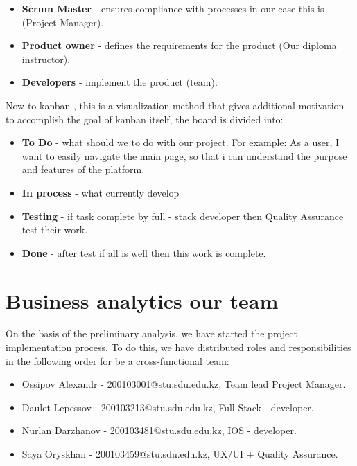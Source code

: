 \begin{itemize}
    \item \textbf{Scrum Master} - ensures compliance with processes in our case this is  (Project Manager).
    \item \textbf{Product owner} - defines the requirements for the product (Our diploma instructor).
    \item \textbf{Developers} - implement the product (team). 
\end{itemize}

Now to kanban \cite{kanban}, this is a visualization method that gives additional motivation to accomplish the goal of kanban itself, the board is divided into: 

\begin{itemize}
    \item \textbf{To Do} - what should we to do with our project. For example: As a user, I want to easily navigate the main page, so that i can understand the purpose and features of the platform.
    \item \textbf{In process} - what currently develop 
    \item \textbf{Testing} - if task complete by full - stack developer then Quality Assurance test their work.
    \item \textbf{Done} - after test if all is well then this work is complete.
    
\end{itemize}

\section{Business analytics our team}\label{bussanl}
\hspace*{1cm} On the basis of the preliminary analysis, we have started the project implementation process. To do this, we have distributed roles and responsibilities in the following order for be a cross-functional team:

\begin{itemize}
    \item Ossipov Alexandr - 200103001@stu.sdu.edu.kz, Team lead Project Manager. 
    \item Daulet Lepessov  - 200103213@stu.sdu.edu.kz, Full-Stack - developer. 
    \item Nurlan Darzhanov - 200103481@stu.sdu.edu.kz, IOS - developer. 
    \item Saya Oryskhan  - 200103459@stu.sdu.edu.kz, UX/UI + Quality Assurance.  
\end{itemize}

